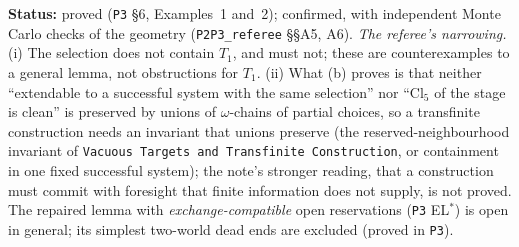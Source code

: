 \documentclass[11pt]{article}
\theoremstyle{definition}
\theoremstyle{remark}
\newcommand{\src}[1]{\texttt{#1}}
\newcommand{\status}[1]{\par\smallskip\noindent\textbf{Status:} #1\par\smallskip}
\begin{document}
\status{proved (\src{P3} \S6, Examples~1 and~2); confirmed, with independent Monte Carlo checks of the geometry (\src{P2P3\_referee} \S\S A5, A6). \emph{The referee's narrowing.} (i) The selection does not contain $T_1$, and must not; these are counterexamples to a general lemma, not obstructions for $T_1$. (ii) What (b) proves is that neither ``extendable to a successful system with the same selection'' nor ``$\mathrm{Cl}_5$ of the stage is clean'' is preserved by unions of $\omega$-chains of partial choices, so a transfinite construction needs an invariant that unions preserve (the reserved-neighbourhood invariant of \src{Vacuous Targets and Transfinite Construction}, or containment in one fixed successful system); the note's stronger reading, that a construction must commit with foresight that finite information does not supply, is not proved. The repaired lemma with \emph{exchange-compatible} open reservations (\src{P3} EL$^*$) is open in general; its simplest two-world dead ends are excluded (proved in \src{P3}).}
\end{document}
